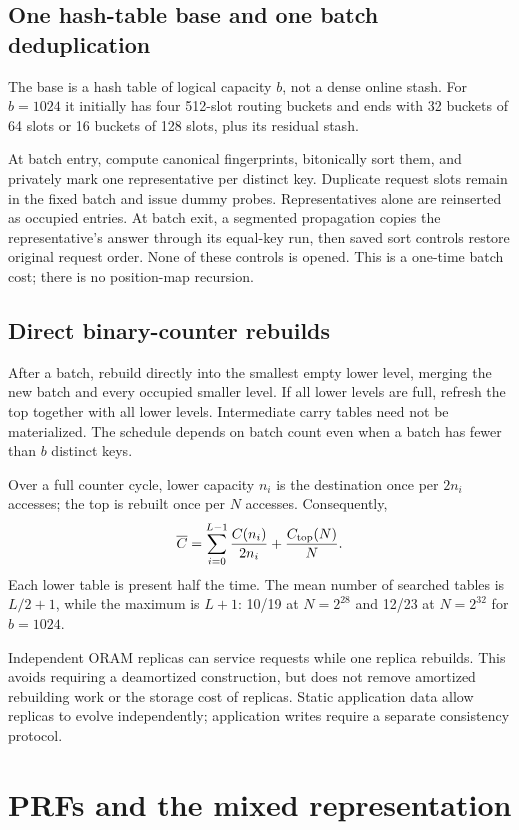 \documentclass[11pt]{article}
\begin{document}
\subsection{One hash-table base and one batch deduplication}
The base is a hash table of logical capacity $b$, not a dense online stash.
For $b=1024$ it initially has four 512-slot routing buckets and ends with
32 buckets of 64 slots or 16 buckets of 128 slots, plus its residual stash.

At batch entry, compute canonical fingerprints, bitonically sort them, and
privately mark one representative per distinct key. Duplicate request slots
remain in the fixed batch and issue dummy probes. Representatives alone
are reinserted as occupied entries. At batch exit, a segmented propagation
copies the representative's answer through its equal-key run, then saved
sort controls restore original request order. None of these controls is
opened. This is a one-time batch cost; there is no position-map recursion.

\subsection{Direct binary-counter rebuilds}
After a batch, rebuild directly into the smallest empty lower level, merging
the new batch and every occupied smaller level. If all lower levels are full,
refresh the top together with all lower levels. Intermediate carry tables
need not be materialized. The schedule depends on batch count even when a
batch has fewer than $b$ distinct keys.

Over a full counter cycle, lower capacity $n_i$ is the destination once per
$2n_i$ accesses; the top is rebuilt once per $N$ accesses. Consequently,
\begin{equation}\label{eq:amort}
 \overline C=\sum_{i=0}^{L-1}\frac{C(n_i)}{2n_i}
                  +\frac{C_{\rm top}(N)}N.
\end{equation}
Each lower table is present half the time. The mean number of searched
tables is $L/2+1$, while the maximum is $L+1$: 10/19 at $N=2^{28}$ and
12/23 at $N=2^{32}$ for $b=1024$.

Independent ORAM replicas can service requests while one replica rebuilds.
This avoids requiring a deamortized construction, but does not remove
amortized rebuilding work or the storage cost of replicas. Static application
data allow replicas to evolve independently; application writes require a
separate consistency protocol.

\section{PRFs and the mixed representation}
\end{document}
